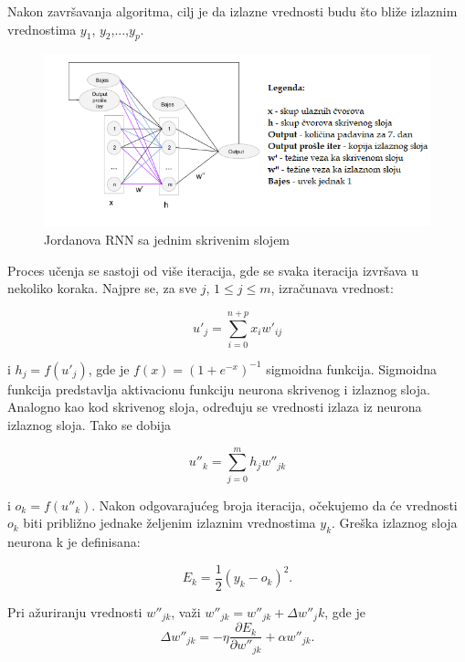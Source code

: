 \documentclass[a4paper]{article}
\begin{document}
Nakon završavanja algoritma, cilj je da izlazne vrednosti budu što bliže izlaznim vrednostima $y_1$, $y_2$,...,$y_p$.

\begin{figure}[h!]
\begin{center}
\includegraphics[scale=0.7]{net.png}
\end{center}
\caption{Jordanova RNN sa jednim skrivenim slojem}
\end{figure}

Proces učenja se sastoji od više iteracija, gde se svaka iteracija izvršava u nekoliko koraka. Najpre se, za sve $j$, $1\leq{}j\leq{}m$, izračunava vrednost:

\begin{equation}
u'_j = \sum_{i=0}^{n+p}x_iw'_{ij}
\end{equation}
 
i $h_j= f(u'_j)$, gde je $f(x)=(1+e^{-x})^{-1}$ sigmoidna funkcija. Sigmoidna funkcija predstavlja aktivacionu funkciju neurona skrivenog i izlaznog sloja. Analogno kao kod skrivenog sloja, određuju se vrednosti izlaza iz neurona izlaznog sloja. Tako se dobija 

\begin{equation}
u{''}_k = \sum_{j=0}^{m}h_jw{''}_{jk}
\end{equation}
 
i $o_k= f(u{''}_k)$. Nakon odgovarajućeg broja iteracija, očekujemo da će vrednosti $o_k$ biti približno jednake željenim izlaznim vrednostima $y_k$.
Greška izlaznog sloja neurona k je definisana:

\begin{equation}
E_k = \frac{1}{2}(y_k - o_k)^2.
\end{equation}

Pri ažuriranju vrednosti $w{''}_{jk}$, važi $w{''}_{jk}=w{''}_{jk}+\Delta{}w{''}_jk$, gde je
$$\Delta{} w{''}_{jk}=- \eta{}\frac{\partial{}E_k}{\partial{}w{''}_{jk}}+\alpha{}w{''}_{jk}.$$
\end{document}
